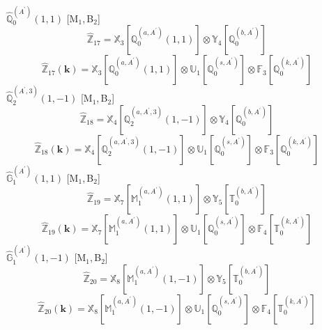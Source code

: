\documentclass[fleqn,10pt,landscape]{article}
\begin{document}
\begin{itemize}
\begin{dmath*}
\end{dmath*}
\vspace{4mm}
\noindent {} $\,\,\,\hat{\mathbb{Q}}_{0}^{(A^{\prime})}(1,1)$ [M$_{1}$,\,B$_{2}$]
\begin{dmath*}
\hat{\mathbb{Z}}_{17}=\mathbb{X}_{3}[\mathbb{Q}_{0}^{(a,A^{\prime})}(1,1)] \otimes\mathbb{Y}_{4}[\mathbb{Q}_{0}^{(b,A^{\prime})}]
\end{dmath*}
\begin{dmath*}
\hat{\mathbb{Z}}_{17}(\bm{k})=\mathbb{X}_{3}[\mathbb{Q}_{0}^{(a,A^{\prime})}(1,1)] \otimes\mathbb{U}_{1}[\mathbb{Q}_{0}^{(s,A^{\prime})}] \otimes\mathbb{F}_{3}[\mathbb{Q}_{0}^{(k,A^{\prime})}]
\end{dmath*}
\vspace{4mm}
\noindent {} $\,\,\,\hat{\mathbb{Q}}_{2}^{(A^{\prime},3)}(1,-1)$ [M$_{1}$,\,B$_{2}$]
\begin{dmath*}
\hat{\mathbb{Z}}_{18}=\mathbb{X}_{4}[\mathbb{Q}_{2}^{(a,A^{\prime},3)}(1,-1)] \otimes\mathbb{Y}_{4}[\mathbb{Q}_{0}^{(b,A^{\prime})}]
\end{dmath*}
\begin{dmath*}
\hat{\mathbb{Z}}_{18}(\bm{k})=\mathbb{X}_{4}[\mathbb{Q}_{2}^{(a,A^{\prime},3)}(1,-1)] \otimes\mathbb{U}_{1}[\mathbb{Q}_{0}^{(s,A^{\prime})}] \otimes\mathbb{F}_{3}[\mathbb{Q}_{0}^{(k,A^{\prime})}]
\end{dmath*}
\vspace{4mm}
\noindent {} $\,\,\,\hat{\mathbb{G}}_{1}^{(A^{\prime})}(1,1)$ [M$_{1}$,\,B$_{2}$]
\begin{dmath*}
\hat{\mathbb{Z}}_{19}=\mathbb{X}_{7}[\mathbb{M}_{1}^{(a,A^{\prime})}(1,1)] \otimes\mathbb{Y}_{5}[\mathbb{T}_{0}^{(b,A^{\prime})}]
\end{dmath*}
\begin{dmath*}
\hat{\mathbb{Z}}_{19}(\bm{k})=\mathbb{X}_{7}[\mathbb{M}_{1}^{(a,A^{\prime})}(1,1)] \otimes\mathbb{U}_{1}[\mathbb{Q}_{0}^{(s,A^{\prime})}] \otimes\mathbb{F}_{4}[\mathbb{T}_{0}^{(k,A^{\prime})}]
\end{dmath*}
\vspace{4mm}
\noindent {} $\,\,\,\hat{\mathbb{G}}_{1}^{(A^{\prime})}(1,-1)$ [M$_{1}$,\,B$_{2}$]
\begin{dmath*}
\hat{\mathbb{Z}}_{20}=\mathbb{X}_{8}[\mathbb{M}_{1}^{(a,A^{\prime})}(1,-1)] \otimes\mathbb{Y}_{5}[\mathbb{T}_{0}^{(b,A^{\prime})}]
\end{dmath*}
\begin{dmath*}
\hat{\mathbb{Z}}_{20}(\bm{k})=\mathbb{X}_{8}[\mathbb{M}_{1}^{(a,A^{\prime})}(1,-1)] \otimes\mathbb{U}_{1}[\mathbb{Q}_{0}^{(s,A^{\prime})}] \otimes\mathbb{F}_{4}[\mathbb{T}_{0}^{(k,A^{\prime})}]

\end{dmath*}
\end{itemize}
\end{document}
